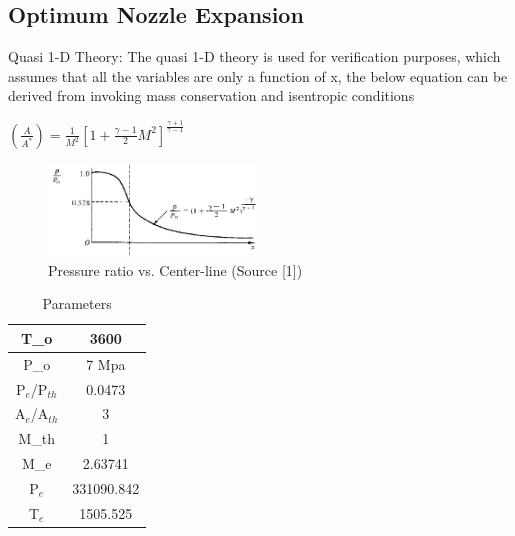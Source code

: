 \subsection{Optimum Nozzle Expansion}
Quasi 1-D Theory: The quasi 1-D theory is used for verification purposes, which assumes that all the variables are only a function of x, the below equation can be derived from invoking mass conservation and isentropic conditions\\
\begin{center}
    $(\frac{A}{A^*}) = \frac{1}{M^2}[1+\frac{\gamma-1}{2}M^2]^{\frac{\gamma+1}{\gamma-1}}$
\end{center}
\begin{figure}[H]
    \centering
    \includegraphics[width=0.5\textwidth]{text/Nozzles_Optimum.PNG}
    \caption[Variation of Pressure ratio a long center-line]{Pressure ratio vs. Center-line (Source [1])}
    \label{fig:Variation of Pressure ratio a long center-line}
\end{figure}

\begin{table}[ht]
    \centering
    \begin{tabular}{|c|c|}
    \hline
    T_{o}  &  3600 \\
    \hline
    P_{o} & 7 Mpa\\
    \hline
    P$_{e}$/P$_{th}$ & 0.0473  \\
    \hline
    A$_e$/A$_{th}$ & 3\\
    \hline
    M_{th} & 1 \\
    \hline
    M_{e} & 2.63741\\
    \hline
    P$_{e}$ & 331090.842 \\
    \hline
    T$_{e}$ & 1505.525 \\
    \hline
    \end{tabular}
    \caption{Parameters}
    \label{tab:my_label}
\end{table}

